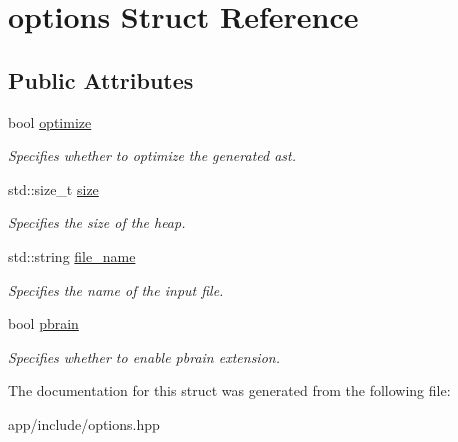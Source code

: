 \hypertarget{structoptions}{}\section{options Struct Reference}
\label{structoptions}
\subsection*{Public Attributes}
\begin{DoxyCompactItemize}
\item 
\hypertarget{structoptions_a8af1b7603b6393be8711439e5c9985a4}{}\label{structoptions_a8af1b7603b6393be8711439e5c9985a4} 
bool \hyperlink{structoptions_a8af1b7603b6393be8711439e5c9985a4}{optimize}
\begin{DoxyCompactList}\small\item\em Specifies whether to optimize the generated ast. \end{DoxyCompactList}\item 
\hypertarget{structoptions_a70b2278d5fd6477af7fecf7e69a0e07b}{}\label{structoptions_a70b2278d5fd6477af7fecf7e69a0e07b} 
std\+::size\+\_\+t \hyperlink{structoptions_a70b2278d5fd6477af7fecf7e69a0e07b}{size}
\begin{DoxyCompactList}\small\item\em Specifies the size of the heap. \end{DoxyCompactList}\item 
\hypertarget{structoptions_a021db9b61479499c1d65da5dfa04b177}{}\label{structoptions_a021db9b61479499c1d65da5dfa04b177} 
std\+::string \hyperlink{structoptions_a021db9b61479499c1d65da5dfa04b177}{file\+\_\+name}
\begin{DoxyCompactList}\small\item\em Specifies the name of the input file. \end{DoxyCompactList}\item 
\hypertarget{structoptions_a8aafbc7ce4badfbaa8e2caf801b84a8e}{}\label{structoptions_a8aafbc7ce4badfbaa8e2caf801b84a8e} 
bool \hyperlink{structoptions_a8aafbc7ce4badfbaa8e2caf801b84a8e}{pbrain}
\begin{DoxyCompactList}\small\item\em Specifies whether to enable pbrain extension. \end{DoxyCompactList}\end{DoxyCompactItemize}


The documentation for this struct was generated from the following file\+:\begin{DoxyCompactItemize}
\item 
app/include/options.\+hpp\end{DoxyCompactItemize}
